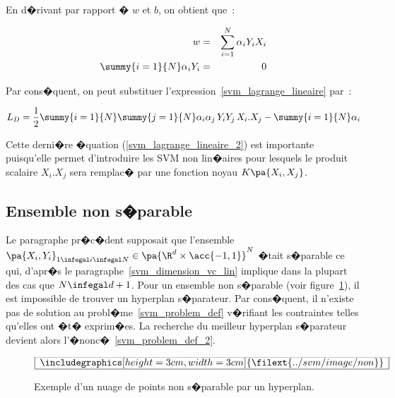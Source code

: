 En d�rivant par rapport � $w$ et $b$, on obtient que~:

        \begin{eqnarray}
        w                                                     &=& \sum_{i=1}^N \alpha_i Y_i X_i \\
        \summy{i=1}{N} \alpha_i Y_i &=& 0
        \end{eqnarray}
        
Par cons�quent, on peut substituer l'expression~\ref{svm_lagrange_lineaire} par~:

            \begin{eqnarray}
            L_D = \frac{1}{2} \summy{i=1}{N}\summy{j=1}{N} 
                                \alpha_i \alpha_j \, Y_i Y_j \, X_i . X_j - 
                                \summy{i=1}{N} \alpha_i
            \label{svm_lagrange_lineaire_2}
            \end{eqnarray}

Cette derni�re �quation (\ref{svm_lagrange_lineaire_2}) est importante puisqu'elle permet d'introduire les SVM non lin�aires pour lesquels le produit scalaire $X_i. X_j$ sera remplac� par une fonction noyau $K\pa{X_i, X_j}$. 




\subsection{Ensemble non s�parable}

Le paragraphe pr�c�dent supposait que l'ensemble $\pa{X_i,Y_i}_{1 \infegal i \infegal N} \in \pa{ \R^d \times \acc{-1,1} }^N$ �tait s�parable ce qui, d'apr�s le paragraphe~\ref{svm_dimension_vc_lin} implique dans la plupart des cas que $N \infegal d+1$. Pour un ensemble non s�parable (voir figure~\ref{svm_non_separable_fig}), il est impossible de trouver un hyperplan s�parateur. Par cons�quent, il n'existe pas de solution au probl�me~\ref{svm_problem_def} v�rifiant les contraintes telles qu'elles ont �t� exprim�es. La recherche du meilleur hyperplan s�parateur devient alors l'�nonc�~\ref{svm_problem_def_2}.


        \begin{figure}[ht]
    $$\frame{$\begin{array}[c|c]{c}\includegraphics[height=3cm, width=3cm]
    {\filext{../svm/image/non}}\end{array}$}$$
    \caption{    Exemple d'un nuage de points non s�parable par un hyperplan.}
    \label{svm_non_separable_fig}
        \end{figure}



